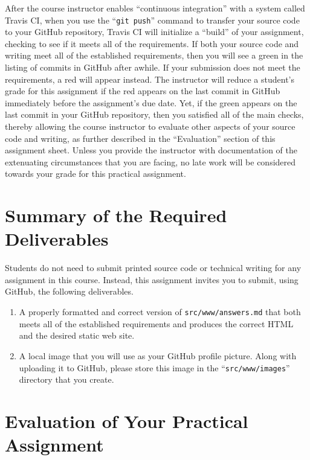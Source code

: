 \documentclass[11pt]{article}
\newcommand{\mainprogramsource}{\lstinline{src/www/answers.md}}
\newcommand{\gitpush}{\command{git push}}
\newcommand{\command}[1]{``\lstinline{#1}''}
\newcommand{\step}[1]{``{#1}''}
\newcommand{\naughtmark}{\ding{55}}
\begin{document}
After the course instructor enables \step{continuous integration} with a system
called Travis CI, when you use the \gitpush{} command to transfer your source
code to your GitHub repository, Travis CI will initialize a \step{build} of your
assignment, checking to see if it meets all of the requirements. If both your
source code and writing meet all of the established requirements, then you will
see a green \checkmark{} in the listing of commits in GitHub after awhile. If
your submission does not meet the requirements, a red \naughtmark{} will appear
instead. The instructor will reduce a student's grade for this assignment if the
red \naughtmark{} appears on the last commit in GitHub immediately before the
assignment's due date. Yet, if the green \checkmark{} appears on the last commit
in your GitHub repository, then you satisfied all of the main checks, thereby
allowing the course instructor to evaluate other aspects of your source code and
writing, as further described in the \step{Evaluation} section of this
assignment sheet. Unless you provide the instructor with documentation of the
extenuating circumstances that you are facing, no late work will be considered
towards your grade for this practical assignment.

\section*{Summary of the Required Deliverables}

\noindent Students do not need to submit printed source code or technical writing for any assignment in this course.
Instead, this assignment invites you to submit, using GitHub, the following deliverables.

\begin{enumerate}

\setlength{\itemsep}{0in}

\item A properly formatted and correct version of \mainprogramsource{} that both
  meets all of the established requirements and produces the correct HTML and
  the desired static web site.

\item A local image that you will use as your GitHub profile picture. Along with
  uploading it to GitHub, please store this image in the
  \command{src/www/images} directory that you create.

\end{enumerate}

\section*{Evaluation of Your Practical Assignment}
\end{document}
